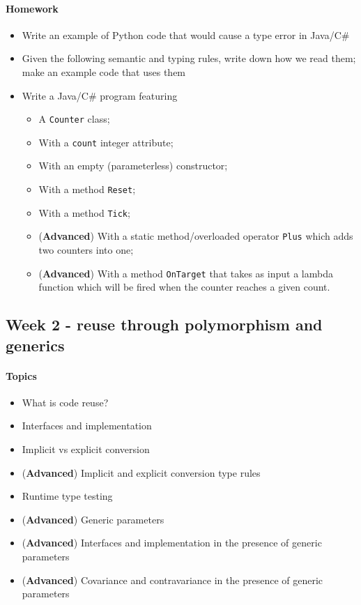 			\paragraph*{Homework}
				\begin{itemize}
					\item Write an example of Python code that would cause a type error in Java/C\#
					\item Given the following semantic and typing rules, write down how we read them; make an example code that uses them
					\item Write a Java/C\# program featuring
					\begin{itemize}
						\item A \texttt{Counter} class;
						\item With a \texttt{count} integer attribute;
						\item With an empty (parameterless) constructor;
						\item With a method \texttt{Reset};
						\item With a method \texttt{Tick};
						\item (\textbf{Advanced}) With a static method/overloaded operator \texttt{Plus} which adds two counters into one;
						\item (\textbf{Advanced}) With a method \texttt{OnTarget} that takes as input a lambda function which will be fired when the counter reaches a given count.
					\end{itemize}
				\end{itemize}


		\subsection{Week 2 - reuse through polymorphism and generics}

		\paragraph*{Topics}

		\begin{itemize}
			\item What is code reuse?
			\item Interfaces and implementation
			\item Implicit vs explicit conversion
			\item (\textbf{Advanced}) Implicit and explicit conversion type rules
			\item Runtime type testing
			\item (\textbf{Advanced}) Generic parameters
			\item (\textbf{Advanced}) Interfaces and implementation in the presence of generic parameters
			\item (\textbf{Advanced}) Covariance and contravariance in the presence of generic parameters
		\end{itemize}

